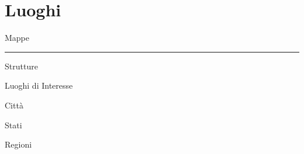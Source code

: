 \section{Luoghi}\label{luoghi}

{Mappe}

\begin{center}\rule{0.5\linewidth}{0.5pt}\end{center}

{Strutture}

{Luoghi
di Interesse}

{Città}

{Stati}

{Regioni}
